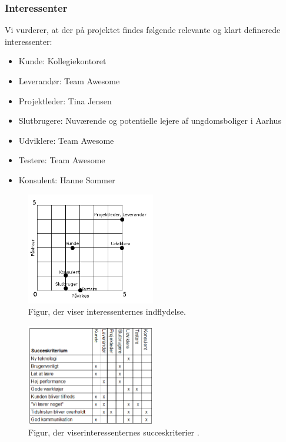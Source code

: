 \documentclass[12pt, a4paper]{report}
\begin{document}
\subsubsection{Interessenter}
Vi vurderer, at der på projektet findes følgende relevante og klart definerede interessenter:
\begin{itemize}
\item Kunde: Kollegiekontoret
\item Leverandør: Team Awesome
\item Projektleder: Tina Jensen
\item Slutbrugere: Nuværende og potentielle lejere af ungdomsboliger i Aarhus
\item Udviklere: Team Awesome
\item Testere: Team Awesome
\item Konsulent: Hanne Sommer
\end{itemize}

\begin{figure}[h!]
\includegraphics[width=0.5\textwidth]{interessenter}
\caption{Figur, der viser interessenternes indflydelse.}
\end{figure}

\begin{figure}[h!]
  \includegraphics[width=0.5\textwidth]{succeskriterium}
  \caption{Figur, der viserinteressenternes succeskriterier .}
\end{figure}
\end{document}
